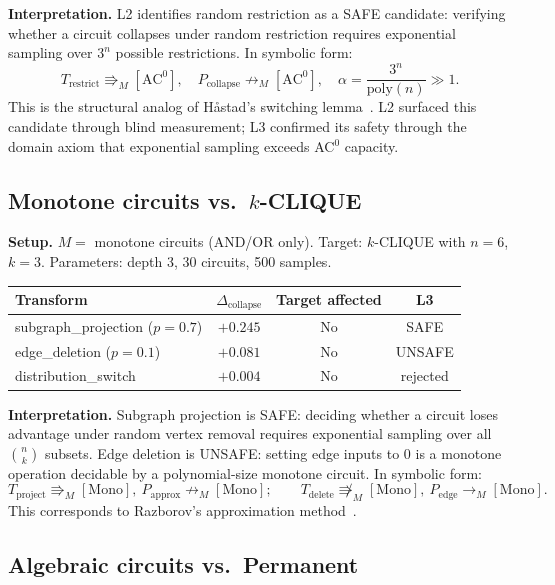 \documentclass[11pt,a4paper]{article}
\newcommand{\derivM}{\rightarrow_M}           %
\newcommand{\unreachM}{\not\rightarrow_M}     %
\newcommand{\extop}{\Rrightarrow_M}           %
\newcommand{\Dcollapse}{\Delta_{\mathrm{collapse}}}
\begin{document}
\textbf{Interpretation.} L2 identifies random restriction as a SAFE candidate: verifying whether a circuit collapses under random restriction requires exponential sampling over $3^n$ possible restrictions. In symbolic form:
\[
T_{\mathrm{restrict}} \extop[\mathrm{AC}^0], \quad P_{\mathrm{collapse}} \unreachM[\mathrm{AC}^0], \quad \alpha = \frac{3^n}{\mathrm{poly}(n)} \gg 1.
\]
This is the structural analog of H\r{a}stad's switching lemma~\cite{Hastad1987}. L2 surfaced this candidate through blind measurement; L3 confirmed its safety through the domain axiom that exponential sampling exceeds AC$^0$ capacity.

\subsection{Monotone circuits vs.\ $k$-CLIQUE}

\textbf{Setup.} $M = $ monotone circuits (AND/OR only). Target: $k$-CLIQUE with $n=6$, $k=3$. Parameters: depth 3, 30 circuits, 500 samples.

\begin{center}
\begin{tabular}{@{}lccc@{}}
\toprule
Transform & $\Dcollapse$ & Target affected & L3 \\
\midrule
subgraph\_projection ($p=0.7$) & $+0.245$ & No & SAFE \\
edge\_deletion ($p=0.1$) & $+0.081$ & No & UNSAFE \\
distribution\_switch & $+0.004$ & No & rejected \\
\bottomrule
\end{tabular}
\end{center}

\textbf{Interpretation.} Subgraph projection is SAFE: deciding whether a circuit loses advantage under random vertex removal requires exponential sampling over all $\binom{n}{k}$ subsets. Edge deletion is UNSAFE: setting edge inputs to 0 is a monotone operation decidable by a polynomial-size monotone circuit. In symbolic form:
\[
T_{\mathrm{project}} \extop[\mathrm{Mono}],\ P_{\mathrm{approx}} \unreachM[\mathrm{Mono}]; \qquad T_{\mathrm{delete}} \not\extop[\mathrm{Mono}],\ P_{\mathrm{edge}} \derivM[\mathrm{Mono}].
\]
This corresponds to Razborov's approximation method~\cite{Razborov1985}.

\subsection{Algebraic circuits vs.\ Permanent}
\end{document}
